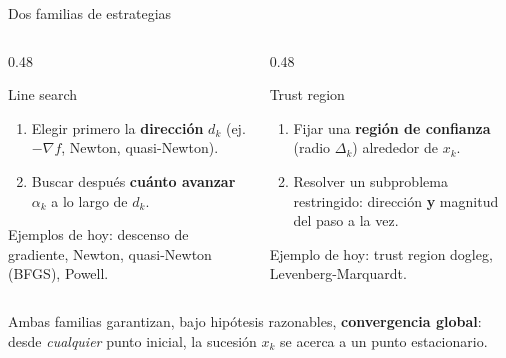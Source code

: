\documentclass[aspectratio=169]{beamer}
\newcommand{\grad}{\nabla}
\begin{document}
\begin{frame}{Dos familias de estrategias}
  \begin{columns}[T]
    \begin{column}{0.48\textwidth}
      \begin{block}{Line search}
        \begin{enumerate}
          \item Elegir primero la \textbf{direcci\'on} $d_k$ (ej. $-\grad f$, Newton, quasi-Newton).
          \item Buscar despu\'es \textbf{cu\'anto avanzar} $\alpha_k$ a lo largo de $d_k$.
        \end{enumerate}
        \vspace{0.3cm}
        Ejemplos de hoy: descenso de gradiente, Newton, quasi-Newton (BFGS), Powell.
      \end{block}
    \end{column}
    \begin{column}{0.48\textwidth}
      \begin{block}{Trust region}
        \begin{enumerate}
          \item Fijar una \textbf{regi\'on de confianza} (radio $\Delta_k$) alrededor de $x_k$.
          \item Resolver un subproblema restringido: direcci\'on \textbf{y} magnitud del paso a la vez.
        \end{enumerate}
        \vspace{0.3cm}
        Ejemplo de hoy: trust region dogleg, Levenberg-Marquardt.
      \end{block}
    \end{column}
  \end{columns}
  \vspace{0.4cm}
  \centering
  Ambas familias garantizan, bajo hip\'otesis razonables, \textbf{convergencia global}: desde \emph{cualquier} punto inicial, la sucesi\'on $x_k$ se acerca a un punto estacionario.
\end{frame}
\end{document}
